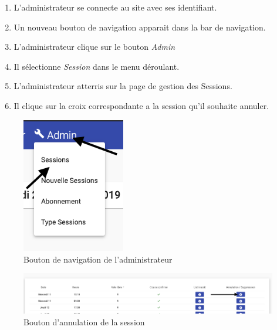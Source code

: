 \begin{enumerate}
	\item L'administrateur se connecte au site avec ses identifiant. 
	\item Un nouveau bouton de navigation apparait dans la bar de navigation. 
	\item L'administrateur clique sur le bouton \textit{Admin}
	\item Il sélectionne \textit{Session} dans le menu déroulant. 
	\item L'administrateur atterris sur la page de gestion des Sessions. 
	\item Il clique sur la croix correspondante a la session qu'il souhaite annuler. 
\end{enumerate}

\newpage
\begin{figure}[h]
	\includegraphics[width=0.4\textwidth,center]{Figures/us10-1}
	\caption{Bouton de navigation de l'administrateur}
\end{figure}

\vspace{\baselineskip}
\vspace{\baselineskip}
\begin{figure}[h]
	\includegraphics[width=\textwidth,center]{Figures/us10-2}
	\caption{Bouton d'annulation de la session}
\end{figure}
